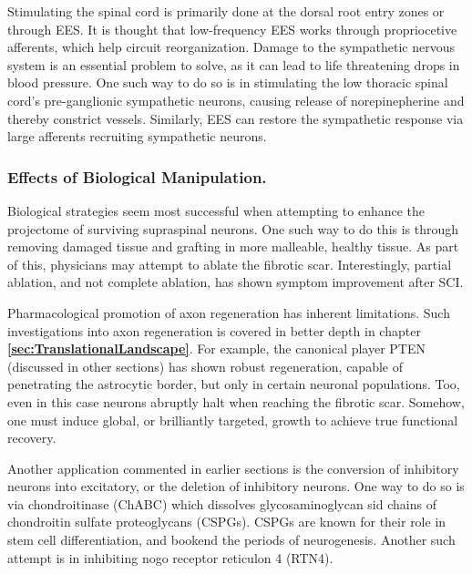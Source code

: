 \documentclass[12pt]{report}
\begin{document}
Stimulating the spinal cord is primarily done at the dorsal root entry zones or through EES. It is thought that low-frequency EES works through propriocetive afferents, which help circuit reorganization. Damage to the sympathetic nervous system is an essential problem to solve, as it can lead to life threatening drops in blood pressure. One such way to do so is in stimulating the low thoracic spinal cord's pre-ganglionic sympathetic neurons, causing release of norepinepherine and thereby constrict vessels. Similarly, EES can restore the sympathetic response via large afferents recruiting sympathetic neurons. 

\subsubsection{Effects of Biological Manipulation.}

Biological strategies seem most successful when attempting to enhance the projectome of surviving supraspinal neurons. One such way to do this is through removing damaged tissue and grafting in more malleable, healthy tissue. As part of this, physicians may attempt to ablate the fibrotic scar. Interestingly, partial ablation, and not complete ablation, has shown symptom improvement after SCI. \newline

Pharmacological promotion of axon regeneration has inherent limitations. Such investigations into axon regeneration is covered in better depth in chapter \textbf{\ref{sec:TranslationalLandscape}}. For example, the canonical player PTEN (discussed in other sections) has shown robust regeneration, capable of penetrating the astrocytic border, but only in certain neuronal populations. Too, even in this case neurons abruptly halt when reaching the fibrotic scar. Somehow, one must induce global, or brilliantly targeted, growth to achieve true functional recovery. \newline

Another application commented in earlier sections is the conversion of inhibitory neurons into excitatory, or the deletion of inhibitory neurons. One way to do so is via chondroitinase (ChABC) which dissolves glycosaminoglycan sid chains of chondroitin sulfate proteoglycans (CSPGs). CSPGs are known for their role in stem cell differentiation, and bookend the periods of neurogenesis. Another such attempt is in inhibiting nogo receptor reticulon 4 (RTN4). \newline
\end{document}

